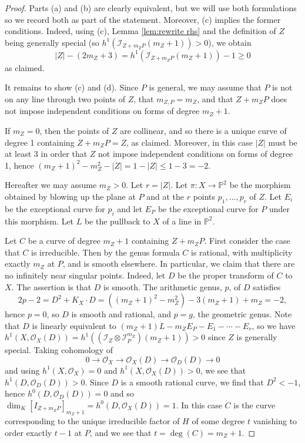 \documentclass[12pt]{amsart}
\numberwithin{equation}{section}
\theoremstyle{definition}
\begin{document}
\begin{proof}
Parts (a) and (b) are clearly equivalent, but we will use both formulations so we record both as part of the statement.
Moreover, (c) implies the former conditions.  Indeed, using (c), Lemma \ref{lem:rewrite rhs} and the definition of $Z$ being generally special (so $h^1(\mathcal I_{Z+m_ZP}(m_Z+1)) > 0$),  we obtain 
\[
|Z| - (2m_Z+3) = h^1(\mathcal I_{Z+m_ZP}(m_Z+1)) - 1 \geq 0
\]
as claimed. 

It remains to show (c) and (d). Since $P$ is general, we may assume that $P$ is not on any line through two points of $Z$, that $m_{Z,P}=m_Z$, 
and that $Z+m_ZP$ does not impose independent conditions on forms of degree $m_Z+1$. 

If $m_Z=0$, then the points of $Z$ are collinear, and so there is a unique 
curve of degree 1 containing $Z+m_ZP=Z$, as claimed. Moreover,
in this case $|Z|$ must be at least 3 in order that $Z$ not impose independent conditions on forms of degree 1,
hence $(m_Z+1)^2-m_Z^2-|Z|=1-|Z|\leq 1-3=-2$.

Hereafter we may assume $m_Z>0$. Let $r=|Z|$.
Let $\pi: X\to { \ensuremath{\mathbb{P}}}^2$ be the morphism obtained by blowing up the plane at $P$ and at the $r$ points $p_1,\ldots,p_r$ of $Z$.
Let $E_i$ be the exceptional curve for $p_i$ and let $E_P$ be the exceptional curve for $P$ under this morphism.
Let $L$ be the pullback to $X$ of a line in ${ \ensuremath{\mathbb{P}}}^2$.

Let $C$ be a curve of degree $m_Z+1$ containing $Z+m_ZP$.
First consider the case that $C$ is irreducible. Then by the genus formula $C$ is rational, with multiplicity exactly $m_Z$ at $P$,
and is smooth elsewhere.  In particular, we claim that  there are no infinitely near singular points. Indeed, 
 let $D$ be the proper transform of $C$ to $X$.  The assertion is that $D$ is smooth. The arithmetic genus, $p$, of $D$ satisfies
\[
2p-2 = D^2 + K_X \cdot D = ((m_Z+1)^2 - m_Z^2) - 3(m_Z+1) + m_Z = -2,
\] 
hence $p = 0$, so $D$ is smooth and rational, and $p=g$, the geometric genus.
Note that $D$ is linearly equivalent to $(m_Z+1)L-m_Z E_P-E_1-\cdots-E_r$,
so we have $h^1(X, \mathcal O_X(D))=h^1((\mathcal I_Z\otimes \mathcal I_P^{m_Z})(m_Z+1))>0$ since $Z$ is generally special.
Taking cohomology of 
$$0\to \mathcal O_X\to \mathcal O_X(D)\to \mathcal O_D(D)\to 0$$
and using $h^1(X, \mathcal O_X)=0$ and $h^1(X,\mathcal O_X(D))>0$, we see
that $h^1(D,\mathcal O_D(D))>0$. Since $D$ is a smooth rational curve, we find that $D^2<-1$, hence
$h^0(D,\mathcal O_D(D))=0$ and so $\dim_K [I_{Z+m_ZP}]_{m_Z+1}=h^0(D,\mathcal O_X(D))=1$.
In this case $C$ is the curve corresponding to the unique irreducible factor of $H$ of some degree $t$ vanishing to order
exactly $t-1$ at $P$, and we see that $t=\deg(C)=m_Z+1$.


\end{proof}
\end{document}
